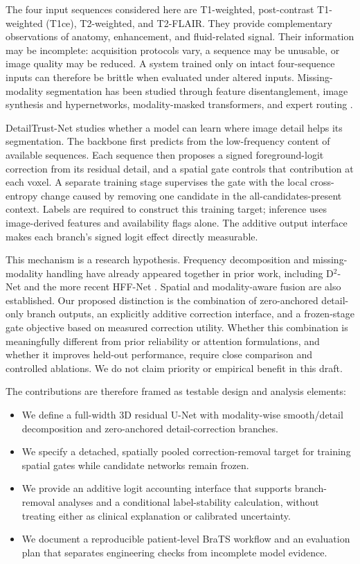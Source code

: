\documentclass[conference]{IEEEtran}
\begin{document}
The four input sequences considered here are T1-weighted, post-contrast T1-weighted (T1ce), T2-weighted, and T2-FLAIR. They provide complementary observations of anatomy, enhancement, and fluid-related signal. Their information may be incomplete: acquisition protocols vary, a sequence may be unusable, or image quality may be reduced. A system trained only on intact four-sequence inputs can therefore be brittle when evaluated under altered inputs. Missing-modality segmentation has been studied through feature disentanglement, image synthesis and hypernetworks, modality-masked transformers, and expert routing \cite{yang2022d2,yang2023hyper,shi2024m2f,zhang2025mome}.

DetailTrust-Net studies whether a model can learn where image detail helps its segmentation. The backbone first predicts from the low-frequency content of available sequences. Each sequence then proposes a signed foreground-logit correction from its residual detail, and a spatial gate controls that contribution at each voxel. A separate training stage supervises the gate with the local cross-entropy change caused by removing one candidate in the all-candidates-present context. Labels are required to construct this training target; inference uses image-derived features and availability flags alone. The additive output interface makes each branch's signed logit effect directly measurable.

This mechanism is a research hypothesis. Frequency decomposition and missing-modality handling have already appeared together in prior work, including D$^2$-Net and the more recent HFF-Net \cite{yang2022d2,shao2025hff}. Spatial and modality-aware fusion are also established. Our proposed distinction is the combination of zero-anchored detail-only branch outputs, an explicitly additive correction interface, and a frozen-stage gate objective based on measured correction utility. Whether this combination is meaningfully different from prior reliability or attention formulations, and whether it improves held-out performance, require close comparison and controlled ablations. We do not claim priority or empirical benefit in this draft.

The contributions are therefore framed as testable design and analysis elements:
\begin{itemize}
\item We define a full-width 3D residual U-Net with modality-wise smooth/detail decomposition and zero-anchored detail-correction branches.
\item We specify a detached, spatially pooled correction-removal target for training spatial gates while candidate networks remain frozen.
\item We provide an additive logit accounting interface that supports branch-removal analyses and a conditional label-stability calculation, without treating either as clinical explanation or calibrated uncertainty.
\item We document a reproducible patient-level BraTS workflow and an evaluation plan that separates engineering checks from incomplete model evidence.
\end{itemize}
\end{document}
